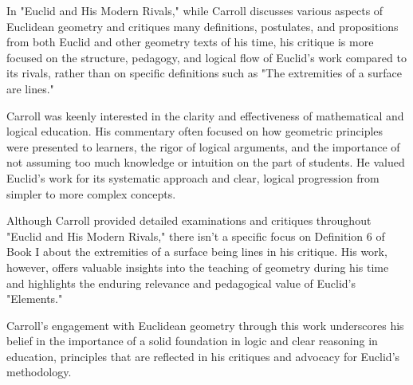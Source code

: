 In "Euclid and His Modern Rivals," while Carroll discusses various aspects of Euclidean geometry and critiques many definitions, postulates, and propositions from both Euclid and other geometry texts of his time, his critique is more focused on the structure, pedagogy, and logical flow of Euclid's work compared to its rivals, rather than on specific definitions such as "The extremities of a surface are lines."

Carroll was keenly interested in the clarity and effectiveness of mathematical and logical education. His commentary often focused on how geometric principles were presented to learners, the rigor of logical arguments, and the importance of not assuming too much knowledge or intuition on the part of students. He valued Euclid's work for its systematic approach and clear, logical progression from simpler to more complex concepts.

Although Carroll provided detailed examinations and critiques throughout "Euclid and His Modern Rivals," there isn't a specific focus on Definition 6 of Book I about the extremities of a surface being lines in his critique. His work, however, offers valuable insights into the teaching of geometry during his time and highlights the enduring relevance and pedagogical value of Euclid's "Elements."

Carroll's engagement with Euclidean geometry through this work underscores his belief in the importance of a solid foundation in logic and clear reasoning in education, principles that are reflected in his critiques and advocacy for Euclid's methodology.
